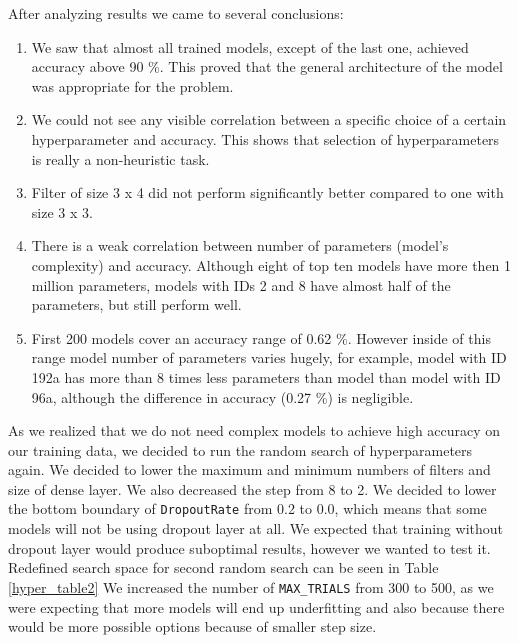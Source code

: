 After analyzing results we came to several conclusions:

\begin{enumerate}
    \item We saw that almost all trained models, except of the last one, achieved accuracy above 90 \%. This proved that the general architecture of the model was appropriate for the problem.
    \item We could not see any visible correlation between a specific choice of a certain hyperparameter and accuracy. This shows that selection of hyperparameters is really a non-heuristic task.
    \item Filter of size 3 x 4 did not perform significantly better compared to one with size 3 x 3. 
    \item There is a weak correlation between number of parameters (model's complexity) and accuracy. Although eight of top ten models have more then 1 million parameters, models with IDs 2 and 8 have almost half of the parameters, but still perform well.
    \item First 200 models cover an accuracy range of 0.62 \%. However inside of this range model number of parameters varies hugely, for example, model with ID 192a has more than 8 times less parameters than model than model with ID 96a, although the difference in accuracy (0.27 \%) is negligible.
\end{enumerate}

As we realized that we do not need complex models to achieve high accuracy on our training data, we decided to run the random search of hyperparameters again.
We decided to lower the maximum and minimum numbers of filters and size of dense layer.
We also decreased the step from 8 to 2.
We decided to lower the bottom boundary of \verb|DropoutRate| from 0.2 to 0.0, which means that some models will not be using dropout layer at all.
We expected that training without dropout layer would produce suboptimal results, however we wanted to test it.
Redefined search space for second random search can be seen in Table \ref{hyper_table2}
We increased the number of \verb|MAX_TRIALS| from 300 to 500, as we were expecting that more models will end up underfitting and also because there would be more possible options because of smaller step size.

